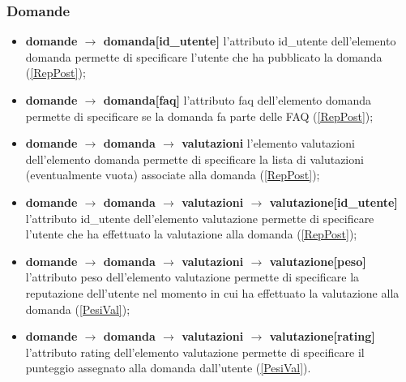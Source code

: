 \documentclass[a4paper, 14pt]{article}
\begin{document}
\begin{flushleft}
			\subsubsection{Domande} 
				\begin{itemize}
					\item \textbf{domande $\rightarrow$ domanda[id\_utente] } l'attributo id\_utente dell'elemento domanda permette di specificare l'utente che ha pubblicato la domanda (\ref{RepPost});
					\item \textbf{domande $\rightarrow$ domanda[faq] } l'attributo faq dell'elemento domanda permette di specificare se la domanda  fa parte delle FAQ (\ref{RepPost});
					\item \textbf{domande $\rightarrow$ domanda $\rightarrow$ valutazioni } l'elemento valutazioni dell'elemento domanda permette di specificare la lista di valutazioni (eventualmente vuota) associate alla domanda (\ref{RepPost});
					\item \textbf{domande $\rightarrow$ domanda $\rightarrow$ valutazioni $\rightarrow$ valutazione[id\_utente]} l'attributo id\_utente dell'elemento valutazione permette di specificare l'utente che ha effettuato la valutazione alla domanda (\ref{RepPost});
					\item \textbf{domande $\rightarrow$ domanda $\rightarrow$ valutazioni $\rightarrow$ valutazione[peso]} l'attributo peso dell'elemento valutazione permette di specificare la reputazione dell'utente nel momento in cui ha effettuato la valutazione alla domanda (\ref{PesiVal});
					\item \textbf{domande $\rightarrow$ domanda $\rightarrow$ valutazioni $\rightarrow$ valutazione[rating]} l'attributo rating dell'elemento valutazione permette di specificare il punteggio assegnato alla domanda dall'utente (\ref{PesiVal}).		
				\end{itemize}
			\smallskip

\end{flushleft}
\end{document}
